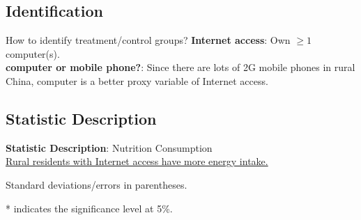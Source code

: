 \documentclass{beamer}	%
\theoremstyle{plain}
\theoremstyle{definition}
\theoremstyle{remark}
\numberwithin{equation}{section}
\begin{document}
\subsection {Identification}
\begin{frame}
	\begin{block}{How to identify treatment/control groups?}
		\linespread{1.2}
		\textbf{Internet access}: Own \(\geq1\) computer(s).\\
		\vspace{.1cm}
		\textbf{computer or mobile phone?}: Since there are lots of 2G mobile phones in rural China, computer is a better proxy variable of Internet access. 
	\end{block}
\end{frame}

\subsection {Statistic Description}
\begin{frame}
	\textbf{Statistic Description}: Nutrition Consumption \\
	\underline{Rural residents with Internet access have more energy intake.} \\
	\centering
	\begin{table}[]
		\caption{Summary Statistics of Nutrition Consumption}
		\begin{tablenotes}
			\item \tiny{Standard deviations/errors in parentheses.}
			\item \tiny{* indicates the significance level at 5\%.}
		\end{tablenotes}		
	\end{table}
\end{frame}
\end{document}
